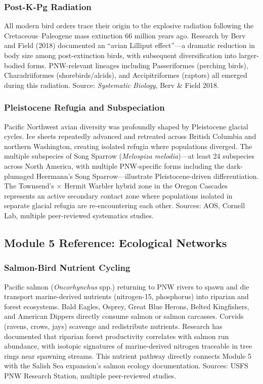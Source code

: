 \documentclass[11pt,letterpaper]{article}
\begin{document}
\subsubsection{Post-K-Pg Radiation}
All modern bird orders trace their origin to the explosive radiation following the Cretaceous--Paleogene mass extinction 66 million years ago. Research by Berv and Field (2018) documented an ``avian Lilliput effect''---a dramatic reduction in body size among post-extinction birds, with subsequent diversification into larger-bodied forms. PNW-relevant lineages including Passeriformes (perching birds), Charadriiformes (shorebirds/alcids), and Accipitriformes (raptors) all emerged during this radiation. Source: \textit{Systematic Biology}, Berv \& Field 2018.

\subsubsection{Pleistocene Refugia and Subspeciation}
Pacific Northwest avian diversity was profoundly shaped by Pleistocene glacial cycles. Ice sheets repeatedly advanced and retreated across British Columbia and northern Washington, creating isolated refugia where populations diverged. The multiple subspecies of Song Sparrow (\textit{Melospiza melodia})---at least 24 subspecies across North America, with multiple PNW-specific forms including the dark-plumaged Heermann's Song Sparrow---illustrate Pleistocene-driven differentiation. The Townsend's $\times$ Hermit Warbler hybrid zone in the Oregon Cascades represents an active secondary contact zone where populations isolated in separate glacial refugia are re-encountering each other. Sources: AOS, Cornell Lab, multiple peer-reviewed systematics studies.

\subsection{Module 5 Reference: Ecological Networks}

\subsubsection{Salmon-Bird Nutrient Cycling}
Pacific salmon (\textit{Oncorhynchus} spp.) returning to PNW rivers to spawn and die transport marine-derived nutrients (nitrogen-15, phosphorus) into riparian and forest ecosystems. Bald Eagles, Osprey, Great Blue Herons, Belted Kingfishers, and American Dippers directly consume salmon or salmon carcasses. Corvids (ravens, crows, jays) scavenge and redistribute nutrients. Research has documented that riparian forest productivity correlates with salmon run abundance, with isotopic signatures of marine-derived nitrogen traceable in tree rings near spawning streams. This nutrient pathway directly connects Module 5 with the Salish Sea expansion's salmon ecology documentation. Sources: USFS PNW Research Station, multiple peer-reviewed studies.
\end{document}
